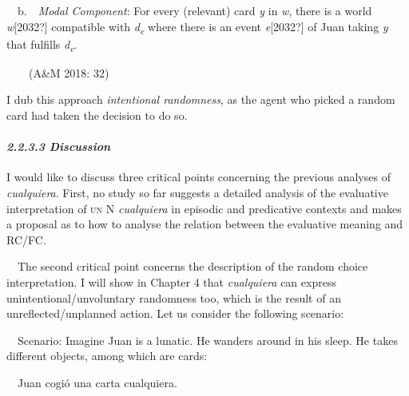 \begin{styleStandard}
\ \ b.\ \ \textit{Modal Component}: For every (relevant) card \textit{y} in \textit{w}, there is a world \textit{w}[2032?] compatible with \textit{d}\textit{\textsubscript{e}} where there is an event \textit{e}[2032?] of Juan taking \textit{y} that fulfills \textit{d}\textit{\textsubscript{e}}.
\end{styleStandard}

\begin{styleStandard}
\ \ \ \ (A\&M 2018: 32)
\end{styleStandard}

\begin{styleStandard}
I dub this approach \textit{intentional randomness}, as the agent who picked a random card had taken the decision to do so. 
\end{styleStandard}

\paragraph[2.2.3.3 Discussion]{\textit{2.2.3.3 Discussion}}
\begin{styleStandard}
I would like to discuss three critical points concerning the previous analyses of \textit{cualquiera}. First, no study so far suggests a detailed analysis of the evaluative interpretation of \textsc{un} N \textit{cualquiera} in episodic and predicative contexts and makes a proposal as to how to analyse the relation between the evaluative meaning and RC/FC. 
\end{styleStandard}

\begin{styleStandard}
\ \ The second critical point concerns the description of the random choice interpretation. I will show in Chapter 4 that \textit{cualquiera} can express unintentional/unvoluntary randomness too, which is the result of an unreflected/unplanned action. Let us consider the following scenario:
\end{styleStandard}

\begin{styleStandard}
\ \ Scenario: Imagine Juan is a lunatic. He wanders around in his sleep. He takes different objects, among which are cards:
\end{styleStandard}

\begin{styleStandard}
\ \ Juan cogió una carta cualquiera.
\end{styleStandard}

